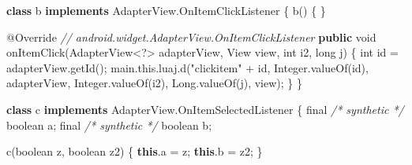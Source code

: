 \documentclass[
]{article}
\newenvironment{Shaded}{}{}
\newcommand{\AttributeTok}[1]{\textcolor[rgb]{0.49,0.56,0.16}{#1}}
\newcommand{\BuiltInTok}[1]{\textcolor[rgb]{0.00,0.50,0.00}{#1}}
\newcommand{\CommentTok}[1]{\textcolor[rgb]{0.38,0.63,0.69}{\textit{#1}}}
\newcommand{\DataTypeTok}[1]{\textcolor[rgb]{0.56,0.13,0.00}{#1}}
\newcommand{\FunctionTok}[1]{\textcolor[rgb]{0.02,0.16,0.49}{#1}}
\newcommand{\KeywordTok}[1]{\textcolor[rgb]{0.00,0.44,0.13}{\textbf{#1}}}
\newcommand{\NormalTok}[1]{#1}
\newcommand{\OperatorTok}[1]{\textcolor[rgb]{0.40,0.40,0.40}{#1}}
\newcommand{\StringTok}[1]{\textcolor[rgb]{0.25,0.44,0.63}{#1}}
\begin{document}
\begin{Shaded}
\begin{Highlighting}[]
    \KeywordTok{class}\NormalTok{ b }\KeywordTok{implements}\NormalTok{ AdapterView}\OperatorTok{.}\FunctionTok{OnItemClickListener} \OperatorTok{\{}
        \FunctionTok{b}\OperatorTok{()} \OperatorTok{\{}
        \OperatorTok{\}}

        \AttributeTok{@Override} \CommentTok{// android.widget.AdapterView.OnItemClickListener}
        \KeywordTok{public} \DataTypeTok{void} \FunctionTok{onItemClick}\OperatorTok{(}\NormalTok{AdapterView}\OperatorTok{\textless{}?\textgreater{}}\NormalTok{ adapterView}\OperatorTok{,} \BuiltInTok{View}\NormalTok{ view}\OperatorTok{,} \DataTypeTok{int}\NormalTok{ i2}\OperatorTok{,} \DataTypeTok{long}\NormalTok{ j}\OperatorTok{)} \OperatorTok{\{}
            \DataTypeTok{int}\NormalTok{ id }\OperatorTok{=}\NormalTok{ adapterView}\OperatorTok{.}\FunctionTok{getId}\OperatorTok{();}
\NormalTok{            main}\OperatorTok{.}\FunctionTok{this}\OperatorTok{.}\FunctionTok{luaj}\OperatorTok{.}\FunctionTok{d}\OperatorTok{(}\StringTok{"clickitem"} \OperatorTok{+}\NormalTok{ id}\OperatorTok{,} \BuiltInTok{Integer}\OperatorTok{.}\FunctionTok{valueOf}\OperatorTok{(}\NormalTok{id}\OperatorTok{),}\NormalTok{ adapterView}\OperatorTok{,} \BuiltInTok{Integer}\OperatorTok{.}\FunctionTok{valueOf}\OperatorTok{(}\NormalTok{i2}\OperatorTok{),} \BuiltInTok{Long}\OperatorTok{.}\FunctionTok{valueOf}\OperatorTok{(}\NormalTok{j}\OperatorTok{),}\NormalTok{ view}\OperatorTok{);}
        \OperatorTok{\}}
    \OperatorTok{\}}

    \KeywordTok{class}\NormalTok{ c }\KeywordTok{implements}\NormalTok{ AdapterView}\OperatorTok{.}\FunctionTok{OnItemSelectedListener} \OperatorTok{\{}
        \DataTypeTok{final} \CommentTok{/* synthetic */} \DataTypeTok{boolean}\NormalTok{ a}\OperatorTok{;}
        \DataTypeTok{final} \CommentTok{/* synthetic */} \DataTypeTok{boolean}\NormalTok{ b}\OperatorTok{;}

        \FunctionTok{c}\OperatorTok{(}\DataTypeTok{boolean}\NormalTok{ z}\OperatorTok{,} \DataTypeTok{boolean}\NormalTok{ z2}\OperatorTok{)} \OperatorTok{\{}
            \KeywordTok{this}\OperatorTok{.}\FunctionTok{a} \OperatorTok{=}\NormalTok{ z}\OperatorTok{;}
            \KeywordTok{this}\OperatorTok{.}\FunctionTok{b} \OperatorTok{=}\NormalTok{ z2}\OperatorTok{;}
        \OperatorTok{\}}


\end{Highlighting}
\end{Shaded}
\end{document}
